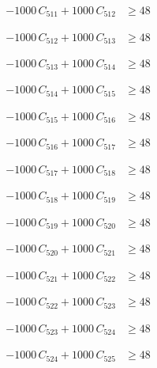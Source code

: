 \documentclass[a4paper,11pt]{article}
\begin{document}
\begin{align}
-1000\,C_{511} + 1000\,C_{512} &\geq 48 \nonumber
\end{align}

\begin{align}
-1000\,C_{512} + 1000\,C_{513} &\geq 48 \nonumber
\end{align}

\begin{align}
-1000\,C_{513} + 1000\,C_{514} &\geq 48 \nonumber
\end{align}

\begin{align}
-1000\,C_{514} + 1000\,C_{515} &\geq 48 \nonumber
\end{align}

\begin{align}
-1000\,C_{515} + 1000\,C_{516} &\geq 48 \nonumber
\end{align}

\begin{align}
-1000\,C_{516} + 1000\,C_{517} &\geq 48 \nonumber
\end{align}

\begin{align}
-1000\,C_{517} + 1000\,C_{518} &\geq 48 \nonumber
\end{align}

\begin{align}
-1000\,C_{518} + 1000\,C_{519} &\geq 48 \nonumber
\end{align}

\begin{align}
-1000\,C_{519} + 1000\,C_{520} &\geq 48 \nonumber
\end{align}

\begin{align}
-1000\,C_{520} + 1000\,C_{521} &\geq 48 \nonumber
\end{align}

\begin{align}
-1000\,C_{521} + 1000\,C_{522} &\geq 48 \nonumber
\end{align}

\begin{align}
-1000\,C_{522} + 1000\,C_{523} &\geq 48 \nonumber
\end{align}

\begin{align}
-1000\,C_{523} + 1000\,C_{524} &\geq 48 \nonumber
\end{align}

\begin{align}
-1000\,C_{524} + 1000\,C_{525} &\geq 48 \nonumber
\end{align}
\end{document}
